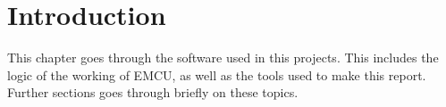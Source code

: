 \documentclass[../../main]{subfiles}
\begin{document}
\section{Introduction} \label{sec:}

This chapter goes through the software used in this projects. This includes the
logic of the working of EMCU, as well as the tools used to make this report. Further
sections goes through briefly on these topics.
\end{document}
